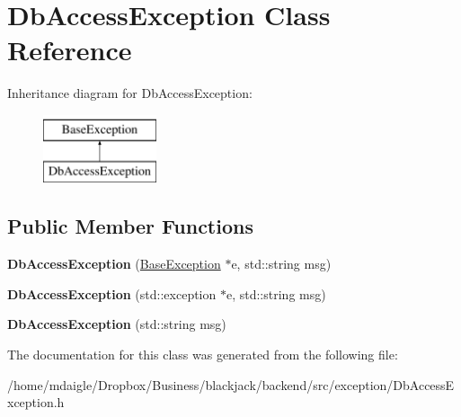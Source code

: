 \hypertarget{classDbAccessException}{
\section{\-Db\-Access\-Exception \-Class \-Reference}
\label{classDbAccessException}
}
\-Inheritance diagram for \-Db\-Access\-Exception\-:\begin{figure}[H]
\begin{center}
\leavevmode
\includegraphics[height=2.000000cm]{classDbAccessException}
\end{center}
\end{figure}
\subsection*{\-Public \-Member \-Functions}
\begin{DoxyCompactItemize}
\item 
\hypertarget{classDbAccessException_acbf20878878697e7129a1596374ba0b9}{
{\bfseries \-Db\-Access\-Exception} (\hyperlink{classBaseException}{\-Base\-Exception} $\ast$e, std\-::string msg)}
\label{classDbAccessException_acbf20878878697e7129a1596374ba0b9}

\item 
\hypertarget{classDbAccessException_a5efe5ca50e564504ced1189d6e796817}{
{\bfseries \-Db\-Access\-Exception} (std\-::exception $\ast$e, std\-::string msg)}
\label{classDbAccessException_a5efe5ca50e564504ced1189d6e796817}

\item 
\hypertarget{classDbAccessException_a5fe5fccb24ed11c27ed60e1d87e66c8e}{
{\bfseries \-Db\-Access\-Exception} (std\-::string msg)}
\label{classDbAccessException_a5fe5fccb24ed11c27ed60e1d87e66c8e}

\end{DoxyCompactItemize}


\-The documentation for this class was generated from the following file\-:\begin{DoxyCompactItemize}
\item 
/home/mdaigle/\-Dropbox/\-Business/blackjack/backend/src/exception/\-Db\-Access\-Exception.\-h\end{DoxyCompactItemize}
